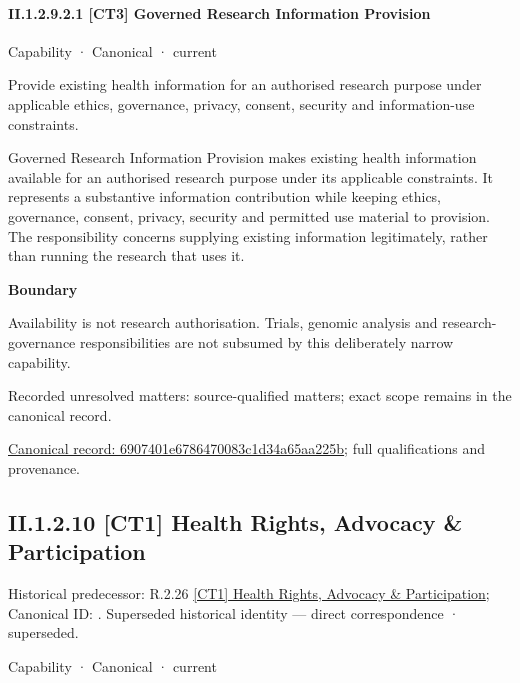 \paragraph*{II.1.2.9.2.1 [CT3] Governed Research Information Provision}
\label{navigation:II.1.2.9.2.1}

\label{element:6907401e6786470083c1d34a65aa225b}
{\small Capability · Canonical · current}\par

Provide existing health information for an authorised research purpose under applicable ethics, governance, privacy, consent, security and information-use constraints.



Governed Research Information Provision makes existing health information available for an authorised research purpose under its applicable constraints. It represents a substantive information contribution while keeping ethics, governance, consent, privacy, security and permitted use material to provision. The responsibility concerns supplying existing information legitimately, rather than running the research that uses it.



\textbf{Boundary}



Availability is not research authorisation. Trials, genomic analysis and research-governance responsibilities are not subsumed by this deliberately narrow capability.


{\small Recorded unresolved matters: source-qualified matters; exact scope remains in the canonical record.}\par
{\footnotesize \href{../../../../continuum/strategy/capability/6907401e6786470083c1d34a65aa225b.md}{Canonical record: 6907401e6786470083c1d34a65aa225b}; full qualifications and provenance.}\par
\subsection*{II.1.2.10 [CT1] Health Rights, Advocacy \& Participation}
\label{navigation:II.1.2.10}

{\small Historical predecessor: R.2.26 \hyperref[element:58376e5c53bf4af0a54f99f21ac52666]{[CT1] Health Rights, Advocacy \& Participation}; Canonical ID: \texttt{}. Superseded historical identity — direct correspondence · superseded.}\par
\label{element:7ab5c82a500b45f39267883a6e78c482}
{\small Capability · Canonical · current}\par

